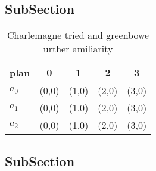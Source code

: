 \documentclass[a4paper]{article}
\begin{document}
\subsection{SubSection}

\begin{table}
\begin{adjustbox}{width=0.5\columnwidth}
\begin{tabular}{|l|l|l|l|l|}
\hline
\textbf{plan} & \multicolumn{1}{c|}{\textbf{0}} & \multicolumn{1}{c|}{\textbf{1}} & \multicolumn{1}{c|}{\textbf{2}} & \multicolumn{1}{c|}{\textbf{3}} \\ \hline
\textbf{$a_0$}  & (0,0) & (1,0) & (2,0) & (3,0) \\ \hline
\textbf{$a_1$}  & (0,0) & (1,0) & (2,0) & (3,0) \\ \hline
\textbf{$a_2$}  & (0,0) & (1,0) & (2,0) & (3,0) \\ \hline
\end{tabular}
\end{adjustbox}
\caption{Charlemagne tried and greenbowe urther amiliarity
}
\end{table}

\subsection{SubSection}
\end{document}
